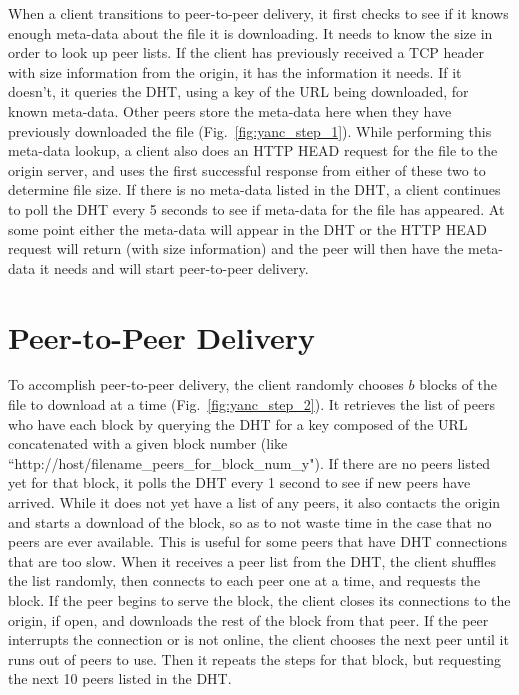 When a client transitions to peer-to-peer delivery, it first checks to see if it knows enough meta-data about the file it is downloading.  
It needs to know the size in order to look up peer lists.
If the client has previously received a TCP header with size information from the origin, it has the information it needs.  If it doesn't, it
queries the DHT, using a key of the URL being downloaded, for known meta-data.  
Other peers store the meta-data here when they have previously downloaded the file (Fig.~\ref{fig:yanc_step_1}). 
While performing this meta-data lookup, a client also does an HTTP HEAD request for the file to the origin server, 
and uses the first successful response from either of these two to determine file size.  
If there is no meta-data listed in the DHT, a client continues to poll the DHT every 5 seconds to see if meta-data for the file has appeared.  At some point
either the meta-data will appear in the DHT or the HTTP HEAD request will return (with size information) and the peer will then have the meta-data 
it needs and will start  peer-to-peer delivery.

\section{Peer-to-Peer Delivery}

To accomplish peer-to-peer delivery, the client randomly chooses $b$ blocks of the file to download at a time (Fig.~\ref{fig:yanc_step_2}).  
It retrieves the list of peers who have each block by querying the DHT for a key composed of
the URL concatenated with a given block number (like ``http://host/filename\_peers\_for\_block\_num\_y").  
If there are no peers listed yet for that block, it polls the DHT every 1 second to see if new peers have arrived.
While it does not yet have a list of any peers, it also contacts the origin and starts a download of the block, so as to 
not waste time in the case that no peers are ever available.  This is useful for some peers that have DHT connections that are too slow.
When it receives a peer list from the DHT, the client shuffles the list randomly, then connects to each peer one at a time, and requests the block.  
If the peer begins to serve the block, the client closes its connections to the origin, if open, and downloads the rest of the block from that peer.  
If the peer interrupts the connection or is not online, the client chooses the next peer until it runs out of peers to use.  
Then it repeats the steps for that block, but requesting the next 10 peers listed in the DHT.

